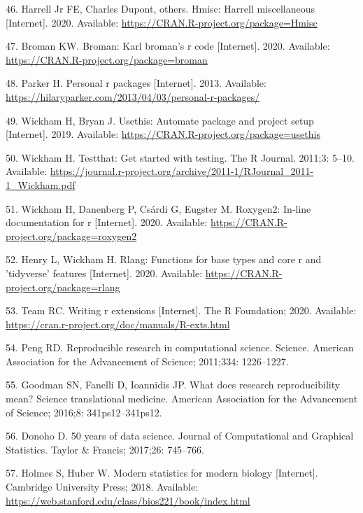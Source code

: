 \documentclass[10pt,letterpaper]{article}
\begin{document}
\leavevmode\hypertarget{ref-Hmisc}{}%
46. Harrell Jr FE, Charles Dupont, others. Hmisc: Harrell miscellaneous
{[}Internet{]}. 2020. Available:
\url{https://CRAN.R-project.org/package=Hmisc}

\leavevmode\hypertarget{ref-broman}{}%
47. Broman KW. Broman: Karl broman's r code {[}Internet{]}. 2020.
Available: \url{https://CRAN.R-project.org/package=broman}

\leavevmode\hypertarget{ref-parker2013}{}%
48. Parker H. Personal r packages {[}Internet{]}. 2013. Available:
\url{https://hilaryparker.com/2013/04/03/personal-r-packages/}

\leavevmode\hypertarget{ref-usethis}{}%
49. Wickham H, Bryan J. Usethis: Automate package and project setup
{[}Internet{]}. 2019. Available:
\url{https://CRAN.R-project.org/package=usethis}

\leavevmode\hypertarget{ref-testthat}{}%
50. Wickham H. Testthat: Get started with testing. The R Journal.
2011;3: 5--10. Available:
\url{https://journal.r-project.org/archive/2011-1/RJournal_2011-1_Wickham.pdf}

\leavevmode\hypertarget{ref-roxygen2}{}%
51. Wickham H, Danenberg P, Csárdi G, Eugster M. Roxygen2: In-line
documentation for r {[}Internet{]}. 2020. Available:
\url{https://CRAN.R-project.org/package=roxygen2}

\leavevmode\hypertarget{ref-rlang}{}%
52. Henry L, Wickham H. Rlang: Functions for base types and core r and
'tidyverse' features {[}Internet{]}. 2020. Available:
\url{https://CRAN.R-project.org/package=rlang}

\leavevmode\hypertarget{ref-Rcore2020}{}%
53. Team RC. Writing r extensions {[}Internet{]}. The R Foundation;
2020. Available:
\url{https://cran.r-project.org/doc/manuals/R-exts.html}

\leavevmode\hypertarget{ref-peng2011}{}%
54. Peng RD. Reproducible research in computational science. Science.
American Association for the Advancement of Science; 2011;334:
1226--1227.

\leavevmode\hypertarget{ref-goodman2016}{}%
55. Goodman SN, Fanelli D, Ioannidis JP. What does research
reproducibility mean? Science translational medicine. American
Association for the Advancement of Science; 2016;8: 341ps12--341ps12.

\leavevmode\hypertarget{ref-donoho2017}{}%
56. Donoho D. 50 years of data science. Journal of Computational and
Graphical Statistics. Taylor \& Francis; 2017;26: 745--766.

\leavevmode\hypertarget{ref-holmes2018}{}%
57. Holmes S, Huber W. Modern statistics for modern biology
{[}Internet{]}. Cambridge University Press; 2018. Available:
\url{https://web.stanford.edu/class/bios221/book/index.html}

\nolinenumbers
\end{document}
